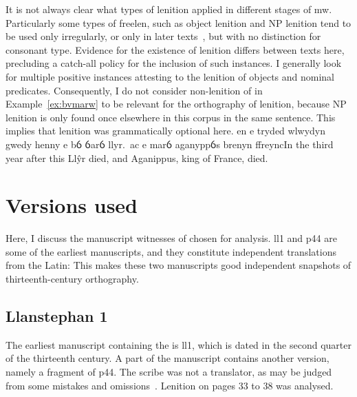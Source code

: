 It is not always clear what types of lenition applied in different
stages of \gls{mw}. Particularly some types of \gls{freelen},
such as object lenition and NP lenition tend to be used only irregularly,
or only in later texts~\autocite{van_sluis_development_2014}, but
with no distinction for consonant type. Evidence for the existence of
lenition differs between texts here, precluding a catch-all policy for
the inclusion of such instances. I generally look for multiple positive
instances attesting to the lenition of objects and nominal predicates.
Consequently, I do not consider non-lenition of  in
Example~\ref{ex:bvmarw} to be relevant for the orthography of lenition,
because NP lenition is only found once elsewhere in this corpus in the
same sentence. This implies that lenition was grammatically optional here.
{en e tryded wlwydyn gwedy henny e bỽ ỽarỽ llyr.\ ac e  marỽ aganyppỽs brenyn ffreync}{In the third year after this Llŷr died, and Aganippus, king of France, died.}


\section{Versions used}
Here, I discuss the manuscript witnesses of 
chosen for analysis. \Gls{ll1} and \gls{p44} are some of the earliest
manuscripts, and they constitute independent translations from the
Latin:
This makes these two manuscripts good independent snapshots of
thirteenth-century orthography.

\subsection{Llanstephan 1}
The earliest manuscript containing the  is \gls{ll1}, which
is dated in the second quarter of the thirteenth century.  A part of
the manuscript contains another version, namely a fragment
of \gls{p44}. The scribe was not a translator, as may be judged from
some mistakes and omissions~\autocite[xxxvii]{roberts_brut_1971}.
Lenition on pages 33 to 38 was analysed.


